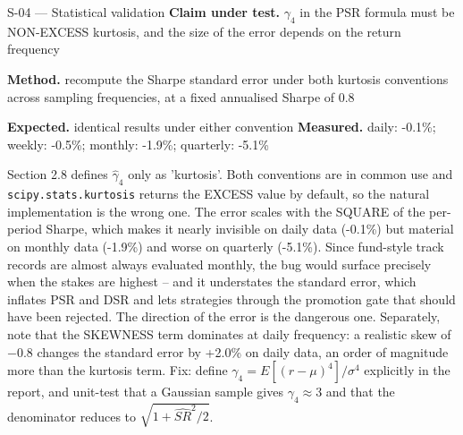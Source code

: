 \begin{caveat}{S-04 \; ---  Statistical validation}
\textbf{Claim under test.} $\gamma_4$ in the PSR formula must be NON-EXCESS kurtosis, and the size of the error depends on the return frequency

\textbf{Method.} recompute the Sharpe standard error under both kurtosis conventions across sampling frequencies, at a fixed annualised Sharpe of 0.8

\textbf{Expected.} identical results under either convention \quad \textbf{Measured.} daily: -0.1\%; weekly: -0.5\%; monthly: -1.9\%; quarterly: -5.1\%

Section 2.8 defines $\hat\gamma_4$ only as 'kurtosis'. Both conventions are in common use and \texttt{scipy.stats.kurtosis} returns the EXCESS value by default, so the natural implementation is the wrong one. The error scales with the SQUARE of the per-period Sharpe, which makes it nearly invisible on daily data (-0.1\%) but material on monthly data (-1.9\%) and worse on quarterly (-5.1\%). Since fund-style track records are almost always evaluated monthly, the bug would surface precisely when the stakes are highest -- and it understates the standard error, which inflates PSR and DSR and lets strategies through the promotion gate that should have been rejected. The direction of the error is the dangerous one. Separately, note that the SKEWNESS term dominates at daily frequency: a realistic skew of $-0.8$ changes the standard error by +2.0\% on daily data, an order of magnitude more than the kurtosis term. Fix: define $\gamma_4=E[(r-\mu)^4]/\sigma^4$ explicitly in the report, and unit-test that a Gaussian sample gives $\gamma_4\approx3$ and that the denominator reduces to $\sqrt{1+\widehat{SR}^2/2}$.
\end{caveat}

